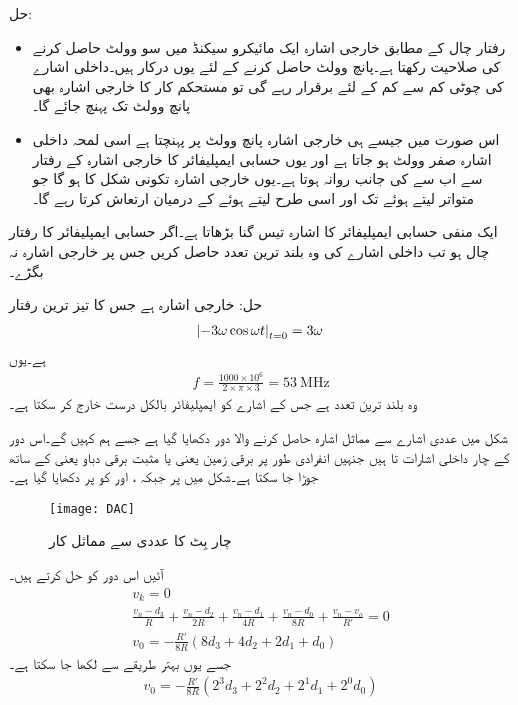 حل:
\begin{itemize}
\item
رفتار چال کے مطابق خارجی اشارہ ایک مائیکرو سیکنڈ میں سو وولٹ حاصل کرنے کی صلاحیت رکھتا ہے۔پانچ وولٹ حاصل کرنے کے لئے یوں  درکار ہیں۔داخلی اشارے کی چوٹی کم سے کم  کے لئے برقرار رہے گی تو مستحکم کار کا خارجی اشارہ بھی پانچ وولٹ تک پہنچ جائے گا۔
\item
اس صورت میں جیسے ہی خارجی اشارہ پانچ وولٹ پر پہنچتا ہے اسی لمحہ داخلی اشارہ صفر وولٹ ہو جاتا ہے اور یوں حسابی ایمپلیفائر کا خارجی اشارہ  کے رفتار سے اب  سے  کی جانب روانہ ہوتا ہے۔یوں خارجی اشارہ تکونی  شکل کا ہو گا جو متواتر  لیتے ہوئے   تک اور اسی طرح  لیتے ہوئے   کے درمیان ارتعاش کرتا رہے گا۔ 
\end{itemize}
ایک منفی حسابی ایمپلیفائر   کا اشارہ تیس گنا بڑھاتا ہے۔اگر حسابی ایمپلیفائر کا رفتار چال  ہو تب داخلی اشارے کی وہ بلند ترین تعدد حاصل کریں جس پر خارجی اشارہ نہ بگڑے۔

حل:
خارجی اشارہ  ہے جس کا تیز ترین رفتار  
\begin{align*}
\abs{-3 \omega \cos \omega t}_{t=0}=3 \omega
\end{align*}
ہے۔یوں 
\begin{align*}
f=\frac{1000 \times 10^6}{2 \times \pi \times 3}=\SI{53}{\mega \hertz}
\end{align*}
وہ بلند ترین تعدد ہے جس کے اشارے کو ایمپلیفائر بالکل درست خارج کر سکتا ہے۔

 
شکل  میں عددی اشارے سے مماثل اشارہ حاصل کرنے والا دور دکھایا گیا ہے جسے ہم  کہیں گے۔اس دور کے چار داخلی اشارات   تا  ہیں جنہیں انفرادی طور پر برقی زمین یعنی  یا مثبت برقی دباو یعنی  کے ساتھ جوڑا جا سکتا ہے۔شکل میں  پر جبکہ ،  اور  کو  پر دکھایا گیا ہے۔
\begin{figure}
\centering
\texttt{[image: DAC]}
\caption{چار بِٹ کا عددی سے مماثل کار}
\label{شکل_حسابی_عددی_سے_مماثل_کار}
\end{figure}
آئیں اس دور کو حل کرتے ہیں۔
\begin{align*}
v_k=0\\
\frac{v_n-d_3}{R}+\frac{v_n-d_2}{2R}+\frac{v_n-d_1}{4R}+\frac{v_n-d_0}{8R}+\frac{v_n-v_o}{R'}=0\\
v_0=-\frac{R'}{8 R} \left(8 d_3+4d_2+2d_1+d_0 \right)
\end{align*}
جسے یوں بہتر طریقے سے لکھا جا سکتا ہے۔
\begin{align} \label{مساوات_حسابی_عددی_سے_مماثل_کار}
v_0=-\frac{R'}{8 R} \left(2^3 d_3+2^2 d_2+2^1 d_1+2^0 d_0 \right)
\end{align}

